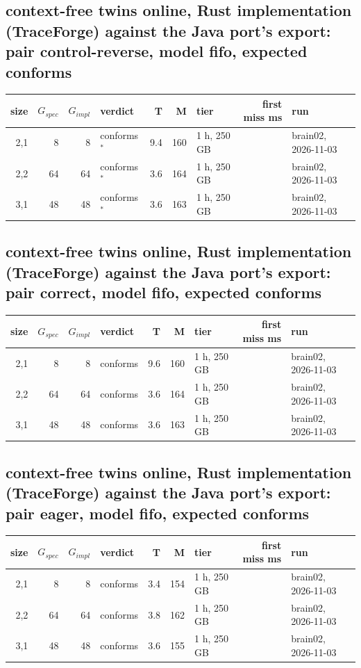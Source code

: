 \documentclass[10pt]{article}
\begin{document}
\subsection*{context-free twins online, Rust implementation (TraceForge) against the Java port's export: pair \textsf{control-reverse}, model fifo, expected conforms}
\begin{longtable}{@{}rrrlrrlrl@{}}
\toprule
size & $G_{\mathit{spec}}$ & $G_{\mathit{impl}}$ & verdict & T & M & tier & first miss ms & run \\
\midrule
\endhead
\color{red} 2,1 & 8 & 8 & conforms$^{\ast}$ & 9.4 & 160 & 1 h, 250 GB &  & brain02, 2026-11-03 \\
\color{red} 2,2 & 64 & 64 & conforms$^{\ast}$ & 3.6 & 164 & 1 h, 250 GB &  & brain02, 2026-11-03 \\
\color{red} 3,1 & 48 & 48 & conforms$^{\ast}$ & 3.6 & 163 & 1 h, 250 GB &  & brain02, 2026-11-03 \\
\bottomrule
\end{longtable}
\subsection*{context-free twins online, Rust implementation (TraceForge) against the Java port's export: pair \textsf{correct}, model fifo, expected conforms}
\begin{longtable}{@{}rrrlrrlrl@{}}
\toprule
size & $G_{\mathit{spec}}$ & $G_{\mathit{impl}}$ & verdict & T & M & tier & first miss ms & run \\
\midrule
\endhead
\color{red} 2,1 & 8 & 8 & conforms & 9.6 & 160 & 1 h, 250 GB &  & brain02, 2026-11-03 \\
\color{red} 2,2 & 64 & 64 & conforms & 3.6 & 164 & 1 h, 250 GB &  & brain02, 2026-11-03 \\
\color{red} 3,1 & 48 & 48 & conforms & 3.6 & 163 & 1 h, 250 GB &  & brain02, 2026-11-03 \\
\bottomrule
\end{longtable}
\subsection*{context-free twins online, Rust implementation (TraceForge) against the Java port's export: pair \textsf{eager}, model fifo, expected conforms}
\begin{longtable}{@{}rrrlrrlrl@{}}
\toprule
size & $G_{\mathit{spec}}$ & $G_{\mathit{impl}}$ & verdict & T & M & tier & first miss ms & run \\
\midrule
\endhead
\color{red} 2,1 & 8 & 8 & conforms & 3.4 & 154 & 1 h, 250 GB &  & brain02, 2026-11-03 \\
\color{red} 2,2 & 64 & 64 & conforms & 3.8 & 162 & 1 h, 250 GB &  & brain02, 2026-11-03 \\
\color{red} 3,1 & 48 & 48 & conforms & 3.6 & 155 & 1 h, 250 GB &  & brain02, 2026-11-03 \\
\bottomrule
\end{longtable}
\end{document}
